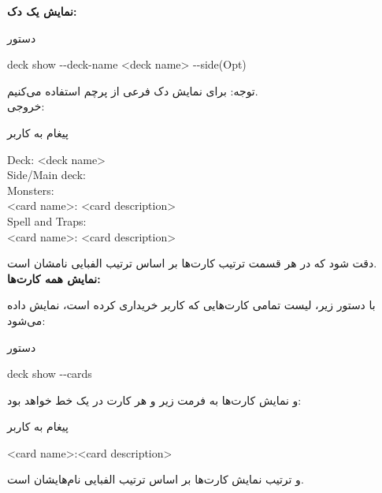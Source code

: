 \documentclass[]{article}
\begin{document}
\vspace{.5cm}
\textbf{نمایش یک دک:}
\begin{mybox}[colback=yellow]{دستور}
	\begin{latin}	
		deck show -{}-deck-name <deck name> -{}-side(Opt)
	\end{latin}
\end{mybox}
توجه: برای نمایش دک فرعی از پرچم   استفاده می‌کنیم.
\\
خروجی:
\begin{mybox}[colback=yellow]{پیغام به کاربر}
	\begin{latin}	
		Deck: <deck name> \\
		Side/Main deck: \\
		Monsters: \\
		<card name>: <card description> \\
		Spell and Traps: \\
		<card name>: <card description> \\
	\end{latin}
\end{mybox}
دقت شود که در هر قسمت ترتیب کارت‌ها بر اساس ترتیب الفبایی نامشان است.
\\
\textbf{نمایش همه کارت‌ها:}

با دستور زیر، لیست تمامی کارت‌هایی که کاربر خریداری کرده است، نمایش داده می‌شود:

\begin{mybox}[colback=yellow]{دستور}
	\begin{latin}	
		deck show -{}-cards
	\end{latin}
\end{mybox}
و نمایش کارت‌ها به فرمت زیر و هر کارت در یک خط خواهد بود:

\begin{mybox}[colback=yellow]{پیغام به کاربر}
	\begin{latin}	
		<card name>:<card description>
	\end{latin}
\end{mybox}

و ترتیب نمایش کارت‌ها بر اساس ترتیب الفبایی نام‌هایشان است.
\end{document}
